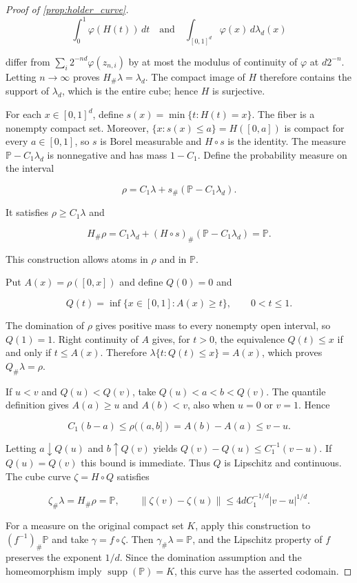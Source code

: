 \begin{proof}[Proof of \cref{prop:holder_curve}]
\[
\int_0^1\varphi(H(t))\,dt
\quad\text{and}\quad
\int_{[0,1]^d}\varphi(x)\,d\lambda_d(x)
\]

differ from $\sum_i2^{-nd}\varphi(z_{n,i})$ by at most the modulus of continuity of $\varphi$ at $d2^{-n}$. Letting $n\rightarrow\infty$ proves $H_{\#}\lambda=\lambda_d$. The compact image of $H$ therefore contains the support of $\lambda_d$, which is the entire cube; hence $H$ is surjective. 

For each $x\in[0,1]^d$, define $s(x)=\min\{t:H(t)=x\}$. The fiber is a nonempty compact set. Moreover, $\{x:s(x)\leqslant a\}=H([0,a])$ is compact for every $a\in[0,1]$, so $s$ is Borel measurable and $H\circ s$ is the identity. The measure $\mathbb P-C_1\lambda_d$ is nonnegative and has mass $1-C_1$. Define the probability measure on the interval

\[
\rho=C_1\lambda+s_{\#}(\mathbb P-C_1\lambda_d).
\]

It satisfies $\rho\geqslant C_1\lambda$ and

\[
H_{\#}\rho=C_1\lambda_d+(H\circ s)_{\#}(\mathbb P-C_1\lambda_d)=\mathbb P.
\]

This construction allows atoms in $\rho$ and in $\mathbb P$. 

Put $A(x)=\rho([0,x])$ and define $Q(0)=0$ and

\[
Q(t)=\inf\{x\in[0,1]:A(x)\geqslant t\},\qquad 0<t\leqslant1.
\]

The domination of $\rho$ gives positive mass to every nonempty open interval, so $Q(1)=1$. Right continuity of $A$ gives, for $t>0$, the equivalence $Q(t)\leqslant x$ if and only if $t\leqslant A(x)$. Therefore $\lambda\{t:Q(t)\leqslant x\}=A(x)$, which proves $Q_{\#}\lambda=\rho$. 

If $u<v$ and $Q(u)<Q(v)$, take $Q(u)<a<b<Q(v)$. The quantile definition gives $A(a)\geqslant u$ and $A(b)<v$, also when $u=0$ or $v=1$. Hence

\[
C_1(b-a)\leqslant\rho((a,b])=A(b)-A(a)\leqslant v-u.
\]

Letting $a\downarrow Q(u)$ and $b\uparrow Q(v)$ yields $Q(v)-Q(u)\leqslant C_1^{-1}(v-u)$. If $Q(u)=Q(v)$ this bound is immediate. Thus $Q$ is Lipschitz and continuous. The cube curve $\zeta=H\circ Q$ satisfies

\[
\zeta_{\#}\lambda=H_{\#}\rho=\mathbb P,
\qquad
\|\zeta(v)-\zeta(u)\|\leqslant4dC_1^{-1/d}|v-u|^{1/d}.
\]

For a measure on the original compact set $K$, apply this construction to $(f^{-1})_{\#}\mathbb P$ and take $\gamma=f\circ\zeta$. Then $\gamma_{\#}\lambda=\mathbb P$, and the Lipschitz property of $f$ preserves the exponent $1/d$. Since the domination assumption and the homeomorphism imply $\operatorname{supp}(\mathbb P)=K$, this curve has the asserted codomain. 
\end{proof}

